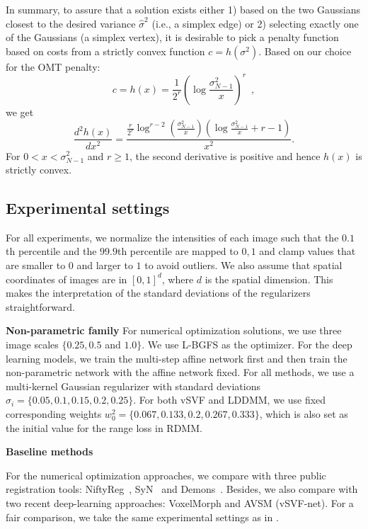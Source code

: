 \documentclass{article}
\numberwithin{equation}{section}
\newcommand{\ie}{{i.e.}}
\begin{document}
In summary, to assure that a solution exists either 1) based on the two Gaussians closest to the desired variance $\hat{\sigma}^2$ (\ie, a simplex edge) or 2) selecting exactly one of the Gaussians (a simplex vertex), it is desirable to pick a penalty function based on costs from a strictly convex function $c=h(\sigma^2)$. Based on our choice for the OMT penalty:
\begin{equation}
  c=h(x)=\frac{1}{2^r}\left(\log\frac{\sigma_{N-1}^2}{x}\right)^r\enspace,
\end{equation}
we get
\begin{equation}
  \frac{d^2h(x)}{dx^2}=\frac{\frac{r}{2^r}\log^{r-2}\left(\frac{\sigma_{N-1}^2}{x}\right)\left(\log\frac{\sigma_{N-1}^2}{x}+r-1\right)}{x^2}.
\end{equation}
For $0<x<\sigma_{N-1}^2$ and $r\geq 1$, the second derivative is positive and hence $h(x)$ is strictly convex.
 
\subsection{Experimental settings}
\label{sec:experimental_settings}

For all experiments, we normalize the intensities of each image such that the $0.1$th percentile and the $99.9$th percentile are mapped to ${0,1}$ and clamp values that are smaller to $0$ and larger to $1$ to avoid outliers. We also assume that spatial coordinates of images are in $[0, 1]^d$, where $d$ is the spatial dimension. This makes the interpretation of the standard deviations of the regularizers straightforward.

{\bf Non-parametric family} For numerical optimization solutions, we use three image scales $\{ 0.25, 0.5$ and $1.0\}$. We use L-BGFS as the optimizer. For the deep learning models, we train the multi-step affine network first and then train the non-parametric network with the affine network fixed. For all methods, we use a multi-kernel Gaussian regularizer with standard deviations $\sigma_i=\{ 0.05, 0.1, 0.15, 0.2, 0.25\}$. For both vSVF and LDDMM, we use fixed corresponding weights $w^2_0=\{0.067, 0.133, 0.2,0.267,0.333\}$, which is also set as the initial value for the range loss in RDMM.

{\bf Baseline methods} 

For the numerical optimization approaches, we compare with three public registration tools: NiftyReg~\cite{ourselin2001reconstructing,modat2014global,rueckert1999nonrigid,modat2010fast}, SyN~\cite{avants2009advanced,avants2008symmetric} and Demons~\cite{vercauteren2009diffeomorphic,vercauteren2008symmetric}. Besides, we also compare with two recent deep-learning approaches: VoxelMorph \cite{dalca2018unsupervised} and AVSM (vSVF-net)\cite{shen2019networks}. For a fair comparison, we take the same experimental settings as in \cite{shen2019networks}.
\end{document}
